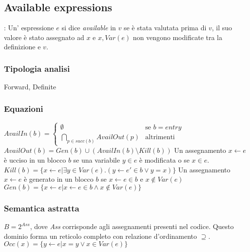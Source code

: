 \documentclass[a4paper, 10pt]{book}
\newenvironment{definition}[1][Definizione]{\begin{trivlist}
\item[\hskip \labelsep {\bfseries #1}]}{\end{trivlist}}
\begin{document}
\newpage
\subsection{Available expressions}
\begin{definition}[Available expression]:
    Un' espressione $e$ si dice \emph{available} in $v$ se è stata valutata prima di $v$, il suo valore è
    stato assegnato ad $x$ e $x, Var(e)$ non vengono modificate tra la definizione e $v$.
\end{definition}

\subsubsection{Tipologia analisi}
\begin{center}
    Forward, Definite
\end{center}
\subsubsection{Equazioni}
$AvailIn(b) = 
	\begin{cases}
		\emptyset &\text{se } b=entry \\
		\bigcap\limits_{p \in succ(b)} AvailOut(p) &\text{altrimenti}
	\end{cases}$
\newline\newline
$AvailOut(b) = Gen(b) \cup (AvailIn(b)\setminus Kill(b))$
\newline\newline\noindent
Un assegnamento $x \gets e$ è ucciso in un blocco $b$ se una variabile $y \in e$ è modificata o se 
$x \in e$.
\newline\newline
$Kill(b) = \{x \gets e | \exists y \in Var(e).(y \gets e' \in b \lor y = x)\}$
\newline\newline\noindent
Un assegnamento $x \gets e$ è generato in un blocco $b$ se $x \gets e \in b$ e $x \notin Var(e)$
\newline\newline
$Gen(b) = \{x \gets e | x \gets e \in b \land x \notin Var(e)\}$

\subsubsection{Semantica astratta}
$B = 2^{Ass}$, dove \emph{Ass} corrisponde agli assegnamenti presenti nel codice. Questo dominio forma un
reticolo completo con relazione d'ordinamento $\supseteq$.
\newline
$Occ(x) = \{ y \gets e | x = y \lor x \in Var(e) \}$
\end{document}
